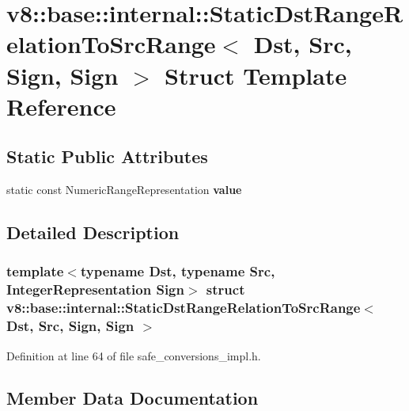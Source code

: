 \hypertarget{structv8_1_1base_1_1internal_1_1StaticDstRangeRelationToSrcRange_3_01Dst_00_01Src_00_01Sign_00_01Sign_01_4}{}\section{v8\+:\+:base\+:\+:internal\+:\+:Static\+Dst\+Range\+Relation\+To\+Src\+Range$<$ Dst, Src, Sign, Sign $>$ Struct Template Reference}
\label{structv8_1_1base_1_1internal_1_1StaticDstRangeRelationToSrcRange_3_01Dst_00_01Src_00_01Sign_00_01Sign_01_4}
\subsection*{Static Public Attributes}
\begin{DoxyCompactItemize}
\item 
static const Numeric\+Range\+Representation {\bfseries value}
\end{DoxyCompactItemize}


\subsection{Detailed Description}
\subsubsection*{template$<$typename Dst, typename Src, Integer\+Representation Sign$>$\newline
struct v8\+::base\+::internal\+::\+Static\+Dst\+Range\+Relation\+To\+Src\+Range$<$ Dst, Src, Sign, Sign $>$}



Definition at line 64 of file safe\+\_\+conversions\+\_\+impl.\+h.



\subsection{Member Data Documentation}
\mbox{\label{structv8_1_1base_1_1internal_1_1StaticDstRangeRelationToSrcRange_3_01Dst_00_01Src_00_01Sign_00_01Sign_01_4_a900026fdb73350908f464603105100b4}} 
